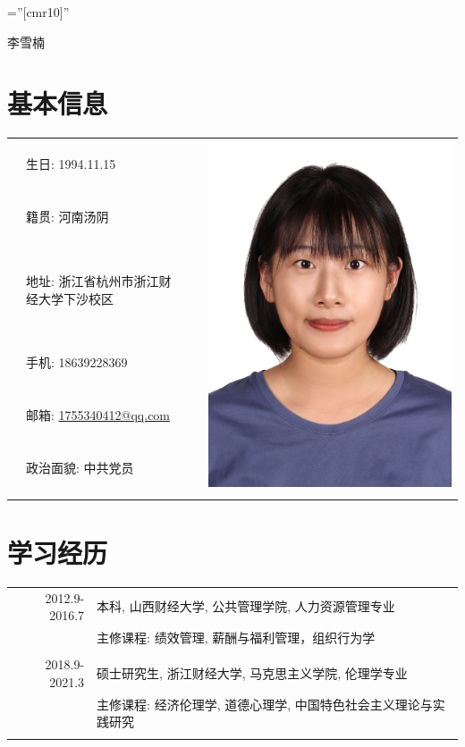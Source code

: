 \documentclass[a4paper,11pt]{article}
\begin{document}

\pagestyle{empty} %

\font\fb=''[cmr10]'' %

\par{
		\begin{center}{\Huge 李雪楠
	}\end{center}

\par}

\section{基本信息}

\begin{tabular}{rlrr}
  &生日: 1994.11.15 & \quad\quad\quad\quad\quad\quad\quad\quad & \multirow{6}{*}{\includegraphics[width=0.18  \textwidth]{baby.jpg}}\\
  &籍贯: 河南汤阴 \\
  &地址: 浙江省杭州市浙江财经大学下沙校区\\
  &手机: 18639228369\\
  &邮箱: \href{mailto:1755340412@qq.com}{1755340412@qq.com}\\
  &政治面貌: 中共党员\\
  \\
\end{tabular}



\section{学习经历}
\begin{tabular}{rl}
\textsc{2012.9-2016.7} & 本科, 山西财经大学, 公共管理学院, 人力资源管理专业\\
& 主修课程: 绩效管理, 薪酬与福利管理，组织行为学\\&\\
\textsc{2018.9-2021.3} & 硕士研究生, 浙江财经大学, 马克思主义学院, 伦理学专业\\
& 主修课程: 经济伦理学, 道德心理学, 中国特色社会主义理论与实践研究\\&\\
\end{tabular}
\end{document}
